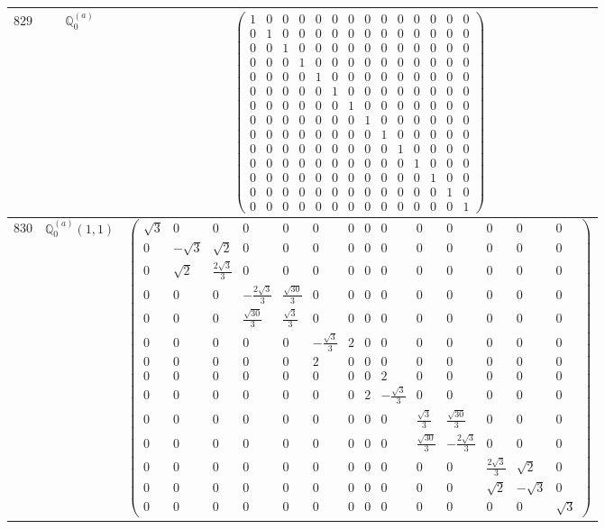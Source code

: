 \documentclass[fleqn,8pt,landscape]{jsarticle}
\begin{document}
\begin{center}
\begin{longtable}{ccc}
$ 829 $ & $ \mathbb{Q}_{0}^{(a)} $ & $ \begin{pmatrix} 1 & 0 & 0 & 0 & 0 & 0 & 0 & 0 & 0 & 0 & 0 & 0 & 0 & 0 \\ 0 & 1 & 0 & 0 & 0 & 0 & 0 & 0 & 0 & 0 & 0 & 0 & 0 & 0 \\ 0 & 0 & 1 & 0 & 0 & 0 & 0 & 0 & 0 & 0 & 0 & 0 & 0 & 0 \\ 0 & 0 & 0 & 1 & 0 & 0 & 0 & 0 & 0 & 0 & 0 & 0 & 0 & 0 \\ 0 & 0 & 0 & 0 & 1 & 0 & 0 & 0 & 0 & 0 & 0 & 0 & 0 & 0 \\ 0 & 0 & 0 & 0 & 0 & 1 & 0 & 0 & 0 & 0 & 0 & 0 & 0 & 0 \\ 0 & 0 & 0 & 0 & 0 & 0 & 1 & 0 & 0 & 0 & 0 & 0 & 0 & 0 \\ 0 & 0 & 0 & 0 & 0 & 0 & 0 & 1 & 0 & 0 & 0 & 0 & 0 & 0 \\ 0 & 0 & 0 & 0 & 0 & 0 & 0 & 0 & 1 & 0 & 0 & 0 & 0 & 0 \\ 0 & 0 & 0 & 0 & 0 & 0 & 0 & 0 & 0 & 1 & 0 & 0 & 0 & 0 \\ 0 & 0 & 0 & 0 & 0 & 0 & 0 & 0 & 0 & 0 & 1 & 0 & 0 & 0 \\ 0 & 0 & 0 & 0 & 0 & 0 & 0 & 0 & 0 & 0 & 0 & 1 & 0 & 0 \\ 0 & 0 & 0 & 0 & 0 & 0 & 0 & 0 & 0 & 0 & 0 & 0 & 1 & 0 \\ 0 & 0 & 0 & 0 & 0 & 0 & 0 & 0 & 0 & 0 & 0 & 0 & 0 & 1 \end{pmatrix} $ \\ \hline
$ 830 $ & $ \mathbb{Q}_{0}^{(a)}(1,1) $ & $ \begin{pmatrix} \sqrt{3} & 0 & 0 & 0 & 0 & 0 & 0 & 0 & 0 & 0 & 0 & 0 & 0 & 0 \\ 0 & - \sqrt{3} & \sqrt{2} & 0 & 0 & 0 & 0 & 0 & 0 & 0 & 0 & 0 & 0 & 0 \\ 0 & \sqrt{2} & \frac{2 \sqrt{3}}{3} & 0 & 0 & 0 & 0 & 0 & 0 & 0 & 0 & 0 & 0 & 0 \\ 0 & 0 & 0 & - \frac{2 \sqrt{3}}{3} & \frac{\sqrt{30}}{3} & 0 & 0 & 0 & 0 & 0 & 0 & 0 & 0 & 0 \\ 0 & 0 & 0 & \frac{\sqrt{30}}{3} & \frac{\sqrt{3}}{3} & 0 & 0 & 0 & 0 & 0 & 0 & 0 & 0 & 0 \\ 0 & 0 & 0 & 0 & 0 & - \frac{\sqrt{3}}{3} & 2 & 0 & 0 & 0 & 0 & 0 & 0 & 0 \\ 0 & 0 & 0 & 0 & 0 & 2 & 0 & 0 & 0 & 0 & 0 & 0 & 0 & 0 \\ 0 & 0 & 0 & 0 & 0 & 0 & 0 & 0 & 2 & 0 & 0 & 0 & 0 & 0 \\ 0 & 0 & 0 & 0 & 0 & 0 & 0 & 2 & - \frac{\sqrt{3}}{3} & 0 & 0 & 0 & 0 & 0 \\ 0 & 0 & 0 & 0 & 0 & 0 & 0 & 0 & 0 & \frac{\sqrt{3}}{3} & \frac{\sqrt{30}}{3} & 0 & 0 & 0 \\ 0 & 0 & 0 & 0 & 0 & 0 & 0 & 0 & 0 & \frac{\sqrt{30}}{3} & - \frac{2 \sqrt{3}}{3} & 0 & 0 & 0 \\ 0 & 0 & 0 & 0 & 0 & 0 & 0 & 0 & 0 & 0 & 0 & \frac{2 \sqrt{3}}{3} & \sqrt{2} & 0 \\ 0 & 0 & 0 & 0 & 0 & 0 & 0 & 0 & 0 & 0 & 0 & \sqrt{2} & - \sqrt{3} & 0 \\ 0 & 0 & 0 & 0 & 0 & 0 & 0 & 0 & 0 & 0 & 0 & 0 & 0 & \sqrt{3} \end{pmatrix} $ \\ \hline

\end{longtable}
\end{center}
\end{document}
